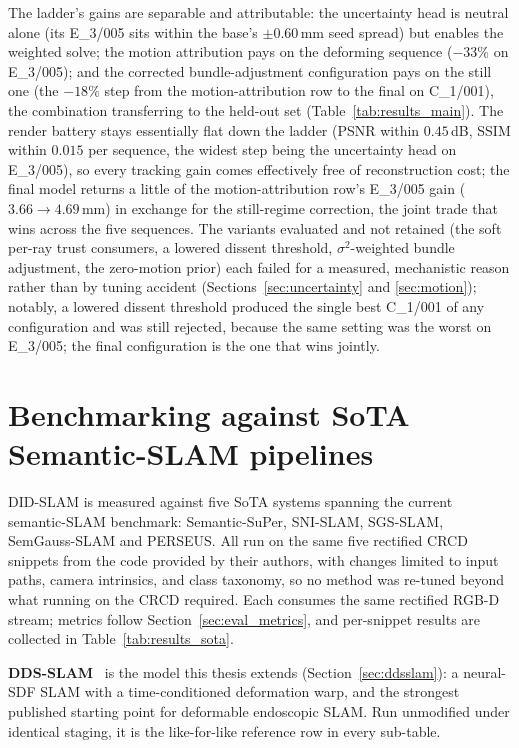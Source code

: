 \documentclass{article}
\begin{document}
The ladder's gains are separable and attributable: the uncertainty head is neutral alone (its E\_3/005 sits within the base's $\pm 0.60$\,mm seed spread) but enables the weighted solve; the motion attribution pays on the deforming sequence ($-33\%$ on E\_3/005); and the corrected bundle-adjustment configuration pays on the still one (the $-18\%$ step from the motion-attribution row to the final on C\_1/001), the combination transferring to the held-out set (Table~\ref{tab:results_main}). The render battery stays essentially flat down the ladder (PSNR within $0.45$\,dB, SSIM within $0.015$ per sequence, the widest step being the uncertainty head on E\_3/005), so every tracking gain comes effectively free of reconstruction cost; the final model returns a little of the motion-attribution row's E\_3/005 gain ($3.66 \to 4.69$\,mm) in exchange for the still-regime correction, the joint trade that wins across the five sequences. The variants evaluated and not retained (the soft per-ray trust consumers, a lowered dissent threshold, $\sigma^2$-weighted bundle adjustment, the zero-motion prior) each failed for a measured, mechanistic reason rather than by tuning accident (Sections~\ref{sec:uncertainty} and \ref{sec:motion}); notably, a lowered dissent threshold produced the single best C\_1/001 of any configuration and was still rejected, because the same setting was the worst on E\_3/005; the final configuration is the one that wins jointly.

\section{Benchmarking against SoTA Semantic-SLAM pipelines}
\label{sec:benchmarking}
DID-SLAM is measured against five SoTA systems spanning the current semantic-SLAM benchmark: Semantic-SuPer, SNI-SLAM, SGS-SLAM, SemGauss-SLAM and PERSEUS. All run on the same five rectified CRCD snippets from the code provided by their authors, with changes limited to input paths, camera intrinsics, and class taxonomy, so no method was re-tuned beyond what running on the CRCD required. Each consumes the same rectified RGB-D stream; metrics follow Section~\ref{sec:eval_metrics}, and per-snippet results are collected in Table~\ref{tab:results_sota}.

\textbf{DDS-SLAM}~\cite{Shan2024} is the model this thesis extends (Section~\ref{sec:ddsslam}): a neural-SDF SLAM with a time-conditioned deformation warp, and the strongest published starting point for deformable endoscopic SLAM. Run unmodified under identical staging, it is the like-for-like reference row in every sub-table.
\end{document}
